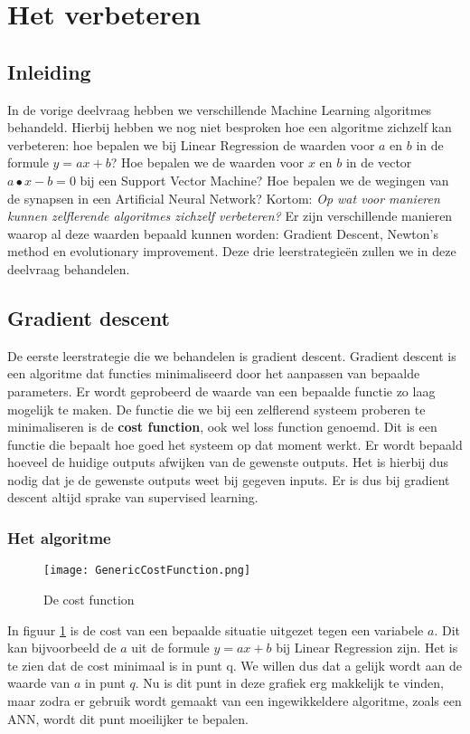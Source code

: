 \section{Het verbeteren}

\subsection{Inleiding}
In de vorige deelvraag hebben we verschillende Machine Learning algoritmes behandeld. Hierbij hebben we nog niet besproken hoe een algoritme zichzelf kan verbeteren: hoe bepalen we bij Linear Regression de waarden voor $a$ en $b$ in de formule $ y = ax + b $? Hoe bepalen we de waarden voor  $x$ en $b$ in de vector $ a ∙ x - b = 0 $ bij een Support Vector Machine? Hoe bepalen we de wegingen van de synapsen in een Artificial Neural Network? Kortom: \textit{Op wat voor manieren kunnen zelflerende algoritmes zichzelf verbeteren?} Er zijn verschillende manieren waarop al deze waarden bepaald kunnen worden: Gradient Descent, Newton's method en evolutionary improvement. Deze drie leerstrategieën zullen we in deze deelvraag behandelen.

\subsection{Gradient descent}
De eerste leerstrategie die we behandelen is gradient descent. Gradient descent is een algoritme dat functies minimaliseerd door het aanpassen van bepaalde parameters. Er wordt geprobeerd de waarde van een bepaalde functie zo laag mogelijk te maken. De functie die we bij een zelflerend systeem proberen te minimaliseren is de \textbf{cost function}, ook wel loss function genoemd. Dit is een functie die bepaalt hoe goed het systeem op dat moment werkt. Er wordt bepaald hoeveel de huidige outputs afwijken van de gewenste outputs. Het is hierbij dus nodig dat je de gewenste outputs weet bij gegeven inputs. Er is dus bij gradient descent altijd sprake van supervised learning. 

\subsubsection{Het algoritme} 
\begin{figure}[h]
  \centering
    \texttt{[image: GenericCostFunction.png]}
  \caption{De cost function}
  \label{fig:GenericCostFunction}
\end{figure}

In figuur \ref{fig:GenericCostFunction} is de cost van een bepaalde situatie uitgezet tegen een variabele $a$. Dit kan bijvoorbeeld de $a$ uit de formule $ y = ax + b $ bij Linear Regression zijn.  Het is te zien dat de cost minimaal is in punt q. We willen dus dat a gelijk wordt aan de waarde van $a$ in punt $q$. Nu is dit punt in deze grafiek erg makkelijk te vinden, maar zodra er gebruik wordt gemaakt van een ingewikkeldere algoritme, zoals een ANN, wordt dit punt moeilijker te bepalen.


